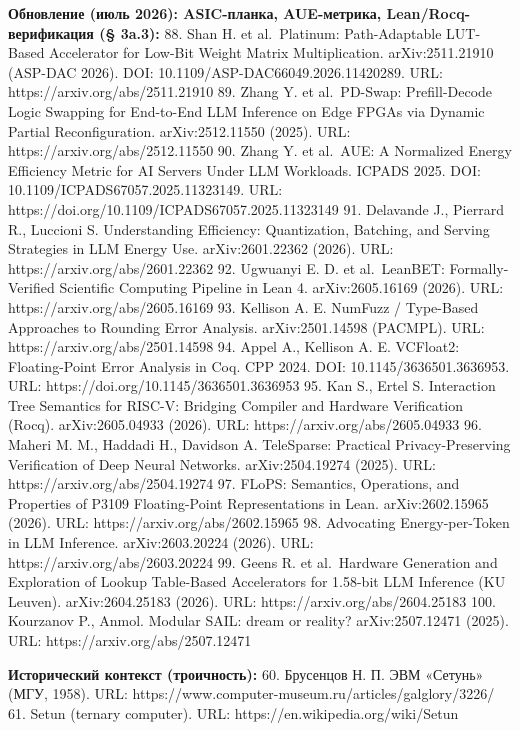 \documentclass[
  russian,
]{article}
\begin{document}
\textbf{Обновление (июль 2026): ASIC-планка, AUE-метрика,
Lean/Rocq-верификация (§ 3a.3):} 88. Shan H. et al.~Platinum:
Path-Adaptable LUT-Based Accelerator for Low-Bit Weight Matrix
Multiplication. arXiv:2511.21910 (ASP-DAC 2026). DOI:
10.1109/ASP-DAC66049.2026.11420289. URL:
https://arxiv.org/abs/2511.21910 89. Zhang Y. et al.~PD-Swap:
Prefill-Decode Logic Swapping for End-to-End LLM Inference on Edge FPGAs
via Dynamic Partial Reconfiguration. arXiv:2512.11550 (2025). URL:
https://arxiv.org/abs/2512.11550 90. Zhang Y. et al.~AUE: A Normalized
Energy Efficiency Metric for AI Servers Under LLM Workloads. ICPADS
2025. DOI: 10.1109/ICPADS67057.2025.11323149. URL:
https://doi.org/10.1109/ICPADS67057.2025.11323149 91. Delavande J.,
Pierrard R., Luccioni S. Understanding Efficiency: Quantization,
Batching, and Serving Strategies in LLM Energy Use. arXiv:2601.22362
(2026). URL: https://arxiv.org/abs/2601.22362 92. Ugwuanyi E. D. et
al.~LeanBET: Formally-Verified Scientific Computing Pipeline in Lean 4.
arXiv:2605.16169 (2026). URL: https://arxiv.org/abs/2605.16169 93.
Kellison A. E. NumFuzz / Type-Based Approaches to Rounding Error
Analysis. arXiv:2501.14598 (PACMPL). URL:
https://arxiv.org/abs/2501.14598 94. Appel A., Kellison A. E. VCFloat2:
Floating-Point Error Analysis in Coq. CPP 2024. DOI:
10.1145/3636501.3636953. URL: https://doi.org/10.1145/3636501.3636953
95. Kan S., Ertel S. Interaction Tree Semantics for RISC-V: Bridging
Compiler and Hardware Verification (Rocq). arXiv:2605.04933 (2026). URL:
https://arxiv.org/abs/2605.04933 96. Maheri M. M., Haddadi H., Davidson
A. TeleSparse: Practical Privacy-Preserving Verification of Deep Neural
Networks. arXiv:2504.19274 (2025). URL: https://arxiv.org/abs/2504.19274
97. FLoPS: Semantics, Operations, and Properties of P3109 Floating-Point
Representations in Lean. arXiv:2602.15965 (2026). URL:
https://arxiv.org/abs/2602.15965 98. Advocating Energy-per-Token in LLM
Inference. arXiv:2603.20224 (2026). URL:
https://arxiv.org/abs/2603.20224 99. Geens R. et al.~Hardware Generation
and Exploration of Lookup Table-Based Accelerators for 1.58-bit LLM
Inference (KU Leuven). arXiv:2604.25183 (2026). URL:
https://arxiv.org/abs/2604.25183 100. Kourzanov P., Anmol. Modular SAIL:
dream or reality? arXiv:2507.12471 (2025). URL:
https://arxiv.org/abs/2507.12471

\textbf{Исторический контекст (троичность):} 60. Брусенцов Н. П. ЭВМ
«Сетунь» (МГУ, 1958). URL:
https://www.computer-museum.ru/articles/galglory/3226/ 61. Setun
(ternary computer). URL: https://en.wikipedia.org/wiki/Setun
\end{document}
